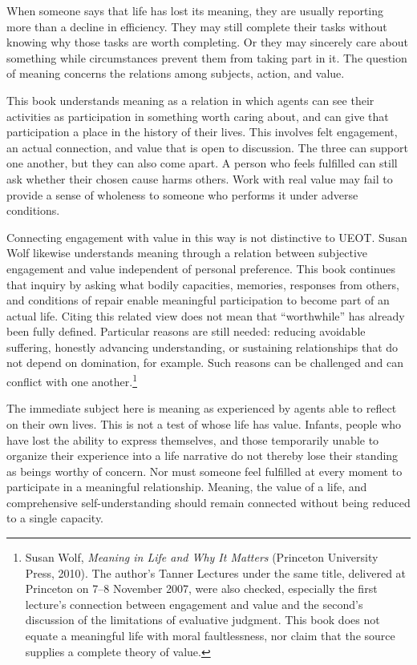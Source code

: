 \documentclass[
  english,
  11pt,
  oneside]{book}
\begin{document}
When someone says that life has lost its meaning, they are usually reporting more than a decline in efficiency. They may still complete their tasks without knowing why those tasks are worth completing. Or they may sincerely care about something while circumstances prevent them from taking part in it. The question of meaning concerns the relations among subjects, action, and value.

This book understands meaning as a relation in which agents can see their activities as participation in something worth caring about, and can give that participation a place in the history of their lives. This involves felt engagement, an actual connection, and value that is open to discussion. The three can support one another, but they can also come apart. A person who feels fulfilled can still ask whether their chosen cause harms others. Work with real value may fail to provide a sense of wholeness to someone who performs it under adverse conditions.

Connecting engagement with value in this way is not distinctive to UEOT. Susan Wolf likewise understands meaning through a relation between subjective engagement and value independent of personal preference. This book continues that inquiry by asking what bodily capacities, memories, responses from others, and conditions of repair enable meaningful participation to become part of an actual life. Citing this related view does not mean that ``worthwhile'' has already been fully defined. Particular reasons are still needed: reducing avoidable suffering, honestly advancing understanding, or sustaining relationships that do not depend on domination, for example. Such reasons can be challenged and can conflict with one another.\footnote{\hypertarget{ph-note-56}{}Susan Wolf, \emph{Meaning in Life and Why It Matters} (Princeton University Press, 2010). The author's Tanner Lectures under the same title, delivered at Princeton on 7--8 November 2007, were also checked, especially the first lecture's connection between engagement and value and the second's discussion of the limitations of evaluative judgment. This book does not equate a meaningful life with moral faultlessness, nor claim that the source supplies a complete theory of value.}

The immediate subject here is meaning as experienced by agents able to reflect on their own lives. This is not a test of whose life has value. Infants, people who have lost the ability to express themselves, and those temporarily unable to organize their experience into a life narrative do not thereby lose their standing as beings worthy of concern. Nor must someone feel fulfilled at every moment to participate in a meaningful relationship. Meaning, the value of a life, and comprehensive self-understanding should remain connected without being reduced to a single capacity.
\end{document}
